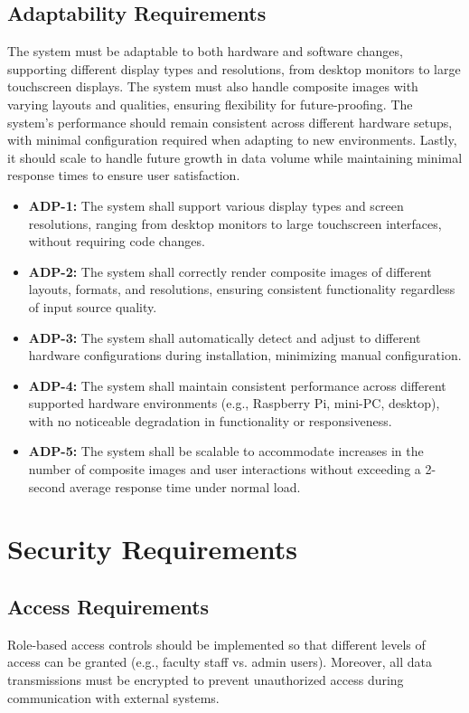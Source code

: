 \documentclass[12pt]{article}
\begin{document}
\subsection{Adaptability Requirements}
The system must be adaptable to both hardware and software changes, supporting different display types and resolutions, from desktop monitors to large touchscreen displays. The system must also handle composite images with varying layouts and qualities, ensuring flexibility for future-proofing. The system’s performance should remain consistent across different hardware setups, with minimal configuration required when adapting to new environments. Lastly, it should scale to handle future growth in data volume while maintaining minimal response times to ensure user satisfaction.

\begin{itemize}
    \item \textbf{ADP-1:} The system shall support various display types and screen resolutions, ranging from desktop monitors to large touchscreen interfaces, without requiring code changes.
    \item \textbf{ADP-2:} The system shall correctly render composite images of different layouts, formats, and resolutions, ensuring consistent functionality regardless of input source quality.
    \item \textbf{ADP-3:} The system shall automatically detect and adjust to different hardware configurations during installation, minimizing manual configuration.
    \item \textbf{ADP-4:} The system shall maintain consistent performance across different supported hardware environments (e.g., Raspberry Pi, mini-PC, desktop), with no noticeable degradation in functionality or responsiveness.
    \item \textbf{ADP-5:} The system shall be scalable to accommodate increases in the number of composite images and user interactions without exceeding a 2-second average response time under normal load.
\end{itemize}


\section{Security Requirements}

\subsection{Access Requirements}
Role-based access controls should be implemented so that different levels of access can be granted (e.g., faculty staff vs. admin users). Moreover, all data transmissions must be encrypted to prevent unauthorized access during communication with external systems.
\end{document}
